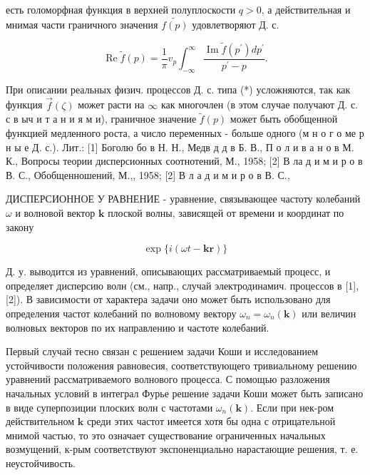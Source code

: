 \documentclass[10pt]{article}
\begin{document}
есть голоморфная функция в верхней полуплоскости $q>0$, а действительная и мнимая части граничного значения $\tilde{f(p)}$ удовлетворяют Д. с.



\[

\operatorname{Re} \tilde{f}(p)=\frac{1}{\pi} v_{p} \int_{-\infty}^{\infty} \frac{\operatorname{Im} \tilde{f}\left(p^{\prime}\right) d p^{\prime}}{p^{\prime}-p} .

\]



При описании реальных физич. процессов Д. с. типа (*) усложняются, так как функция $\vec{f}(\zeta)$ может расти на $\infty$ как многочлен (в этом случае получают Д. с. с в ыч и т а н и я м и), граничное значение $\tilde{f}(p)$ может быть обобщенной функцией медленного роста, а число переменных - больше одного (м н о г о ме р н ы е Д. с.). Лит.: [1] Боголю бо в Н. Н., Медв д д в Б. В., П о л и в а н о в М. К., Вопросы теории дисперсионных соотнотений, М., 1958; [2] В ла д и м и р о в В. С., Обобщенношений, М.,, 1958; [2] В л а д и м и р о в В. С.,



ДИСПЕРСИОННОЕ У РАВНЕНИЕ - уравнение, связывающее частоту колебаний $\omega$ и волновой вектор $\boldsymbol{k}$ плоской волны, зависящей от времени и координат по закону



\[

\exp \{i(\omega t-\boldsymbol{k r})\}

\]



Д. у. выводится из уравнений, описывающих рассматриваемый процесс, и определяет дисперсию волн (см., напр., случай электродинамич. процессов в [1], [2]). В зависимости от характера задачи оно может быть использовано для определения частот колебаний по волновому вектору $\omega_{n}=\omega_{n}(\boldsymbol{k})$ или величин волновых векторов по их направлению и частоте колебаний.



Первый случай тесно связан с решением задачи Коши и исследованием устойчивости положения равновесия, соответствующего тривиальному решению уравнений рассматриваемого волнового процесса. С помощью разложения начальных условий в интеграл Фурье решение задачи Коши может быть записано в виде суперпозиции плоских волн с частотами $\omega_{n}(\boldsymbol{k})$. Если при нек-ром действительном $\boldsymbol{k}$ среди этих частот имеется хотя бы одна с отрицательной мнимой частью, то это означает существование ограниченных начальных возмущений, к-рым соответствуют экспоненциально нарастающие решения, т. е. неустойчивость.
\end{document}

